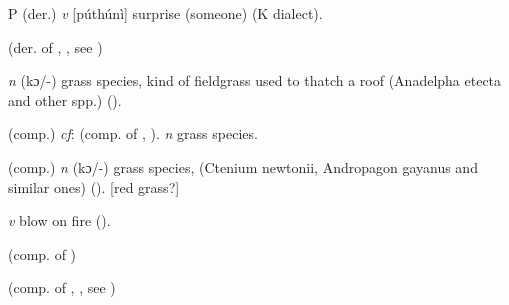 \begin{letter}{P}
 (der.) \textit{v} [púthúnì] surprise (someone) (K dialect). 

 (der. of , , see ) 

 \textit{n} (kɔ/-) grass species, kind of fieldgrass used to thatch a roof (Anadelpha etecta and other spp.) (\citealt{Pichl1967}). 

 (comp.) \textit{cf}:  (comp. of , ). \textit{n} grass species.

 (comp.) \textit{n} (kɔ/-) grass species, (Ctenium newtonii, Andropagon gayanus and similar ones) (\citealt{Pichl1967}). [red grass?] 

 \textit{v} blow on fire (\citealt{Pichl1967}). 

 (comp. of ) 

 (comp. of , , see ) 

\end{letter}
